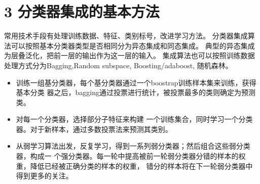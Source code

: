 \documentclass{article}
\begin{document}
\section*{3 分类器集成的基本方法}
常用技术手段有处理训练数据、特征、类别标号，改进学习方法。
分类器集成算法可以按照基本分类器类型是否相同分为异态集成和同态集成。
典型的异态集成为层叠泛化，把前一层的输出作为这一层的输入。
集成算法也可以按照训练数据处理方式分为Bagging,Random subspace, Boosting/adaboost, 随机森林。
\begin{itemize}
	\item {} 训练一组基分类器，每个基分类器通过一个boostrap训练样本集来训练，获得基本分类
	器之后，bagging通过投票进行统计，被投票最多的类则确定为预测类。
	\item {} 对每一个分类器，选择部分子特征来构建
	一个训练集合，同时学习一个分类器。对于新样本，通过多数投票法来预测其类别。
	\item {} 从弱学习算法出发，反复学习，得到一系列弱分类器；然后组合这些弱分类器，构成一
	个强分类器。每一轮中提高被前一轮弱分类器分错的样本的权重，降低已经被正确分类的样本的权重，
	错分的样本将在下一轮弱分类器中得到更多的关注。
\end{itemize}
\end{document}
